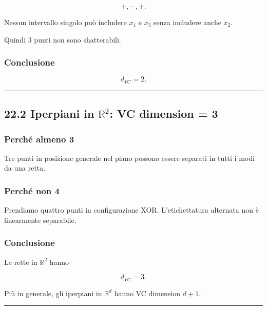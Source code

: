 \documentclass{article}
\begin{document}
\[
+,-,+.
\]

Nessun intervallo singolo può includere \(x_1\) e \(x_3\) senza
includere anche \(x_2\).

Quindi 3 punti non sono shatterabili.

\subsubsection{Conclusione}\label{conclusione-11}

\[
d_{VC}=2.
\]

\begin{center}\rule{0.5\linewidth}{0.5pt}\end{center}

\subsection{\texorpdfstring{22.2 Iperpiani in \(\mathbb{R}^2\): VC
dimension =
3}{22.2 Iperpiani in \textbackslash mathbb\{R\}\^{}2: VC dimension = 3}}\label{iperpiani-in-mathbbr2-vc-dimension-3}

\subsubsection{Perché almeno 3}\label{perchuxe9-almeno-3}

Tre punti in posizione generale nel piano possono essere separati in
tutti i modi da una retta.

\subsubsection{Perché non 4}\label{perchuxe9-non-4}

Prendiamo quattro punti in configurazione XOR. L'etichettatura alternata
non è linearmente separabile.

\subsubsection{Conclusione}\label{conclusione-12}

Le rette in \(\mathbb{R}^2\) hanno

\[
d_{VC}=3.
\]

Più in generale, gli iperpiani in \(\mathbb{R}^d\) hanno VC dimension
\(d+1\).

\begin{center}\rule{0.5\linewidth}{0.5pt}\end{center}
\end{document}
